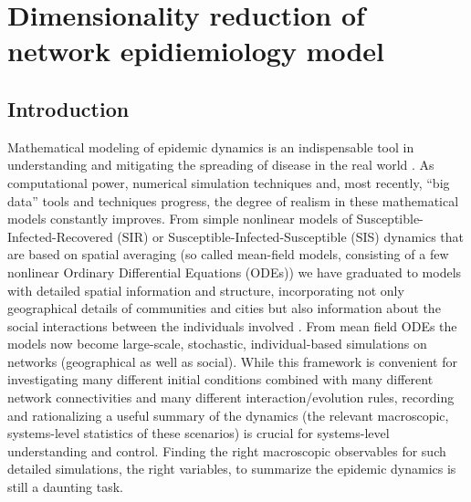 \chapter{Dimensionality reduction of network epidiemiology model \label{ch:sis}}

\section{Introduction}

Mathematical modeling of epidemic dynamics is an indispensable tool in
understanding and mitigating the spreading of disease in the real
world
\cite{gross_epidemic_2006,pastor-satorras_epidemic_2015,segbroeck_adaptive_2010,zhou_epidemic_2012}.
As computational power, numerical simulation techniques and, most
recently, “big data” tools and techniques progress, the degree of
realism in these mathematical models constantly improves. From simple
nonlinear models of Susceptible-Infected-Recovered (SIR) or
Susceptible-Infected-Susceptible (SIS) dynamics that are based on
spatial averaging (so called mean-field models, consisting of a few
nonlinear Ordinary Differential Equations (ODEs)) we have graduated to
models with detailed spatial information and structure, incorporating
not only geographical details of communities and cities but also
information about the social interactions between the individuals
involved \cite{colizza_modeling_2006,wang_epidemic_2011,eubank_modelling_2004}.
From mean field ODEs the models now become large-scale, stochastic,
individual-based simulations on networks (geographical as well as
social).  While this framework is convenient for investigating many
different initial conditions combined with many different network
connectivities and many different interaction/evolution rules,
recording and rationalizing a useful summary of the dynamics (the
relevant macroscopic, systems-level statistics of these scenarios) is
crucial for systems-level understanding and control. Finding the right
macroscopic observables for such detailed simulations, the right
variables, to summarize the epidemic dynamics is still a daunting
task.

